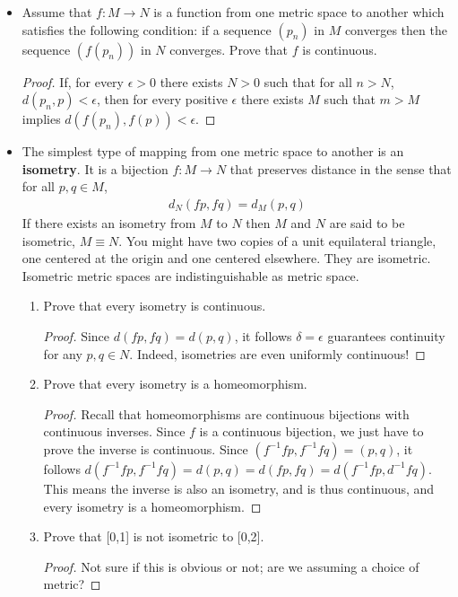 \documentclass[11pt,a4paper]{article}
\newcommand{\pnum}[1]{\item[\textbf{#1}]}
\begin{document}
\begin{itemize}
	\pnum{\hl{2.17}} Assume that $f : M \to N$ is a function from one metric space to another which satisfies
	the following condition: if a sequence $(p_n)$ in $M$ converges then the sequence $(f(p_n))$ in $N$
	converges. Prove that $f$ is continuous.

	\begin{proof}
		If, for every $\epsilon > 0$ there exists $N > 0$ such that for all $n > N$, $d(p_n, p) < \epsilon$,
		then for every positive $\epsilon$ there exists $M$ such that $m > M$ implies $d(f(p_n),
		f(p)) < \epsilon$.
	\end{proof}

	\pnum{2.18} The simplest type of mapping from one metric space to another is an \textbf{isometry}.
	It is a bijection $f : M \to N$ that preserves distance in the sense that for all $p, q \in M$,
	\begin{align}
		d_{N}(fp, fq) = d_M (p,q)
	\end{align}
	If there exists an isometry from $M$ to $N$ then $M$ and $N$ are said to be isometric, $M \equiv N$.
	You might have two copies of a unit equilateral triangle, one centered at the origin and one centered
	elsewhere. They are isometric. Isometric metric spaces are indistinguishable as metric space.

	\begin{enumerate}[label=\alph*)]
		\item Prove that every isometry is continuous.
			\begin{proof}
				Since $d(fp, fq) = d(p, q)$, it follows $\delta = \epsilon$ guarantees continuity for any
				$p,q \in N$. Indeed, isometries are even uniformly continuous!
			\end{proof}
		\item Prove that every isometry is a homeomorphism.
			\begin{proof}
				Recall that homeomorphisms are continuous bijections with continuous inverses. Since $f$ is a
				continuous bijection, we just have to prove the inverse is continuous. Since $(f^{-1}fp,f^{-1}fq)
				= (p,q)$, it follows $d(f^{-1}fp, f^{-1}fq) = d(p,q) = d(fp, fq) = d(f^{-1}fp,d^{-1}fq)$.
				This means the inverse is also an isometry, and is thus continuous, and every isometry is a
				homeomorphism.
			\end{proof}
		\item Prove that [0,1] is not isometric to [0,2].
			\begin{proof}
				Not sure if this is obvious or not; are we assuming a choice of metric?
			\end{proof}
	\end{enumerate}


\end{itemize}
\end{document}
